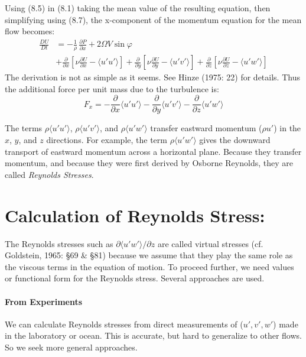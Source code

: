 Using (8.5) in (8.1) taking the mean value of the resulting equation,
then simplifying using (8.7), the x-component of the momentum equation
for the mean flow becomes:
\begin{equation}
\begin{split}
\frac{DU}{Dt} & = -\frac{1}{\rho}\,\frac{\partial{P}}{\partial{x}}  + 2\Omega V\sin\varphi \\
  & + \frac{\partial }{\partial x} \left[ \nu \frac{\partial U}{\partial x} - \langle u'u'\rangle \right]
    + \frac{\partial }{\partial y} \left[ \nu \frac{\partial U}{\partial y} - \langle u'v'\rangle \right] +
      \frac{\partial }{\partial z} \left[ \nu \frac{\partial U}{\partial z} - \langle u'w'\rangle \right]
\end{split}
\end{equation}
The derivation is not as simple as it seems. See Hinze (1975: 22) for
details. Thus the additional force per unit mass due to the
turbulence is:
\begin{equation}
F_x=-\frac{\partial}{\partial{x}}\langle u'u' \rangle
-\frac{\partial}{\partial{y}}\langle u'v' \rangle
-\frac{\partial}{\partial{z}}\langle u'w'\rangle
\end{equation}

The terms $\rho{\langle u' u' \rangle}$, $\rho{\langle u' v' \rangle}$,
and $\rho{\langle u' w' \rangle}$ transfer eastward
momentum ($\rho u' $) in the $x$, $y$, and $z$ directions. For
example, the term $\rho{\langle u' w' \rangle}$ gives the downward
transport of eastward momentum across a
horizontal plane. Because they transfer momentum, and because they
were first derived by Osborne Reynolds, they are called
\textit{Reynolds Stresses}.

\section{Calculation of Reynolds Stress:}
The Reynolds stresses such as
$\partial{\langle u'w'\rangle}/\partial{z}$ are called virtual
stresses (cf. Goldstein, 1965: \S 69 \& \S 81) because we assume that
they play the same role as the viscous terms in the equation of
motion. To proceed further, we need values or functional form for the
Reynolds stress. Several approaches are used.

\paragraph{From Experiments}
We can calculate Reynolds stresses from direct measurements of
($u', v', w'$) made in the laboratory or ocean. This is accurate, but hard
to generalize to other flows. So we seek more general approaches.

